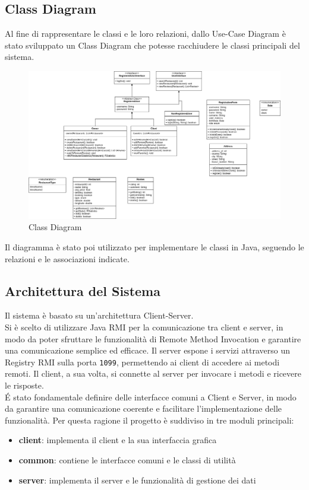 \subsection{Class Diagram}
Al fine di rappresentare le classi e le loro relazioni, dallo 
Use-Case Diagram è stato sviluppato un Class Diagram che potesse 
racchiudere le classi principali del sistema.
\begin{figure}[H]
  \centering
  \includegraphics[width=\textwidth]{images/UML-Class-Diagram.png}
  \caption{Class Diagram}
  \label{fig:class-diagram}
\end{figure}
Il diagramma è stato poi utilizzato per implementare le classi 
in Java, seguendo le relazioni e le associazioni
indicate.

\subsection{Architettura del Sistema}
Il sistema è basato su un'architettura Client-Server.\\
Si è scelto di utilizzare Java RMI per la comunicazione tra client e server,
in modo da poter sfruttare le funzionalità di Remote Method Invocation 
e garantire una comunicazione semplice ed efficace.
Il server espone i servizi attraverso un Registry RMI sulla porta 
\texttt{1099}, permettendo ai client di accedere ai metodi remoti.
Il client, a sua volta, si connette al server per invocare i metodi
e ricevere le risposte.\\

\'E stato fondamentale definire delle interfacce comuni a Client 
e Server, in modo da garantire una comunicazione coerente e
facilitare l'implementazione delle funzionalità.
Per questa ragione il progetto è suddiviso in tre moduli principali:
\begin{itemize}
  \item \textbf{client}: implementa il client e la sua interfaccia grafica
  \item \textbf{common}: contiene le interfacce comuni e le classi di utilità
  \item \textbf{server}: implementa il server e le funzionalità di gestione dei dati
\end{itemize}

